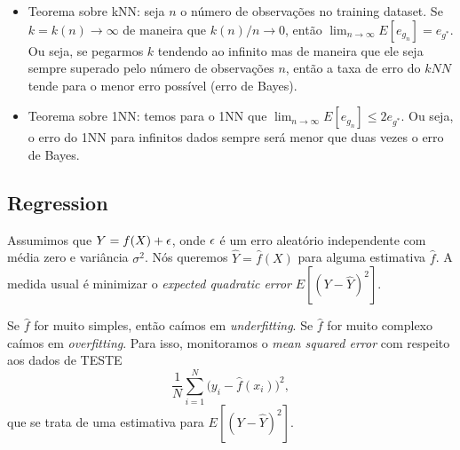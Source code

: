 \documentclass[a4paper,fleqn,12pt]{article}
\begin{document}
\begin{itemize}
\item Teorema sobre kNN: seja $n$ o número de observações no training dataset. Se $k = k(n) \to \infty$ de maneira que $k(n)/n \to 0$, então $\lim_{n \to \infty} E[e_{g_n}] = e_{g^*}$. Ou seja, se pegarmos $k$ tendendo ao infinito mas de maneira que ele seja sempre superado pelo número de observações $n$, então a taxa de erro do $kNN$ tende para o menor erro possível (erro de Bayes).
\item Teorema sobre 1NN: temos para o 1NN que $\lim_{n\to\infty} E[e_{g_n}] \leq 2e_{g^*}$. Ou seja, o erro do 1NN para infinitos dados sempre será menor que duas vezes o erro de Bayes.
\end{itemize}

\subsection{Regression}

Assumimos que $Y = f(X) + \epsilon$, onde $\epsilon$ é um erro aleatório independente com média zero e variância $\sigma^2$. Nós queremos $\hat{Y} = \hat{f}(X)$ para alguma estimativa $\hat{f}$. A medida usual é minimizar o \textit{expected quadratic error} $E[(Y-\hat{Y})^2]$.

Se $\hat{f}$ for muito simples, então caímos em \textit{underfitting}. Se $\hat{f}$ for muito complexo caímos em \textit{overfitting}. Para isso, monitoramos o \textit{mean squared error} com respeito aos dados de TESTE
$$
\frac{1}{N} \sum_{i=1}^N \Big(y_i - \hat{f}(x_i)\Big)^2,
$$
que se trata de uma estimativa para $E[(Y-\hat{Y})^2]$.
\end{document}

